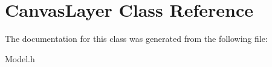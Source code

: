 \hypertarget{classCanvasLayer}{}\section{Canvas\+Layer Class Reference}
\label{classCanvasLayer}


The documentation for this class was generated from the following file\+:\begin{DoxyCompactItemize}
\item 
Model.\+h\end{DoxyCompactItemize}
